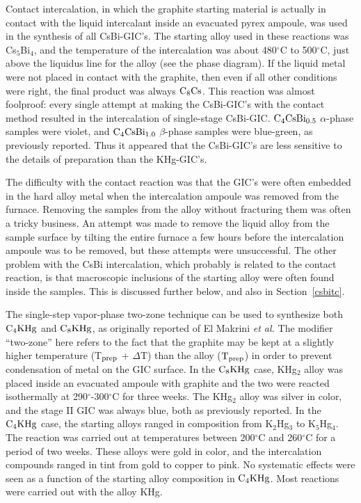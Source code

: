         Contact intercalation,  in which the  graphite starting material is
actually in  contact with the liquid intercalant  inside an evacuated pyrex
ampoule, was used in the synthesis of  all CsBi-GIC's.   The starting alloy
used  in  these  reactions was   Cs$_5$Bi$_4$, and  the temperature of  the
intercalation was  about 480$^{\circ}$C to  500$^{\circ}$C,  just above the
liquidus line for the alloy  (see the phase diagram).   If the liquid metal
were not  placed in   contact with  the graphite, then   even if  all other
conditions were right, the final product was always $\rm C_8Cs$.\cite{E291}
This reaction was almost foolproof:  every   single  attempt at making  the
CsBi-GIC's  with the   contact   method resulted in   the intercalation  of
single-stage CsBi-GIC.  $\rm   C_4CsBi_{0.5}$ $\alpha$-phase  samples  were
violet, and  $\rm C_4CsBi_{1.0}$ $\beta$-phase  samples were blue-green, as
previously reported.   Thus  it  appeared that    the CsBi-GIC's are   less
sensitive to the details of preparation than the KHg-GIC's.

        The difficulty with  the  contact  reaction was that the GIC's were
often embedded in the hard  alloy metal when the  intercalation ampoule was
removed from the  furnace.   Removing the samples   from  the alloy without
fracturing them was often a tricky business.  An attempt was made to remove
the liquid alloy  from the sample surface by  tilting  the entire furnace a
few hours before  the intercalation ampoule was to  be  removed, but  these
attempts were unsuccessful.  The other problem with the CsBi intercalation,
which  probably is related  to  the  contact  reaction, is that macroscopic
inclusions of the starting alloy were often found  inside the samples. This
is discussed further below, and also in Section~\ref{csbitc}.

        The single-step   vapor-phase two-zone technique  can  be  used  to
synthesize both $\rm C_4KHg$ and $\rm C_8KHg$, as originally reported of El
Makrini {\em et  al.  \/}\cite{elmakrini80a} The modifier ``two-zone'' here
refers to  the fact that  the  graphite may be  kept  at  a slightly higher
temperature (T$\rm _{prep}$ + $\Delta$T) than the alloy ($\rm T_{prep}$) in
order to prevent condensation of metal on the GIC surface.\cite{I94} In the
$\rm  C_8KHg$  case,  KHg$_2$ alloy was placed  inside an evacuated ampoule
with graphite  and      the  two      were    reacted  isothermally      at
290$^{\circ}$-300$^{\circ}$C for three weeks.  The KHg$_2$ alloy was silver
in color,  and the  stage II GIC   was always   blue,  both   as previously
reported.\cite{J140}   In  the   $\rm  C_4KHg$     case, the starting alloys  ranged in
composition from K$_2$Hg$_3$  to K$_5$Hg$_4$.   The reaction
was  carried out  at temperatures between 200$^{\circ}$C and 260$^{\circ}$C
for a period  of two  weeks.   These  alloys were   gold in color, and  the
intercalation compounds ranged in  tint from  gold to copper to  pink.   No
systematic   effects were seen   as     a  function of  the starting  alloy
composition in  $\rm  C_4KHg$.  Most reactions  were  carried out  with the
alloy KHg.

